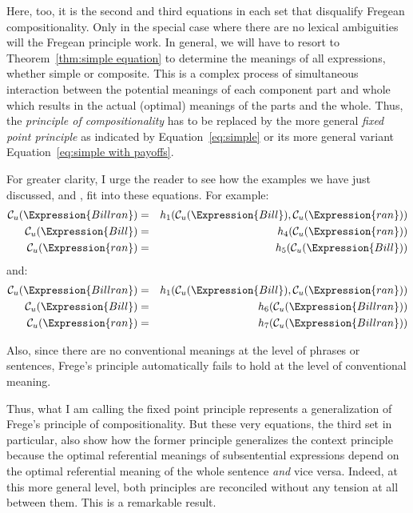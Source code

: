 Here, too, it is the second and third equations in each set that disqualify Fregean compositionality. Only in the special case where there are no lexical ambiguities will the Fregean principle work. In general, we will have to resort to Theorem~\ref{thm:simple equation} to determine the meanings of all expressions, whether simple or composite. This is a complex process of simultaneous interaction between the potential meanings of each component part and whole which results in the actual (optimal) meanings of the parts and the whole. Thus, the \emph{principle of compositionality} has to be replaced by the more general \emph{fixed point principle} as indicated by Equation~\ref{eq:simple} or its more general variant Equation~\ref{eq:simple with payoffs}.

For greater clarity, I urge the reader to see how the examples we have just discussed,  and , fit into these equations. For example:
\begin{eqnarray*}
{\cal C}_u(\Expression{Bill ran}) & = & h_1({\cal C}_u(\Expression{Bill}), {\cal C}_u(\Expression{ran})) \\
{\cal C}_u(\Expression{Bill}) & = & h_4({\cal C}_u(\Expression{ran})) \\
{\cal C}_u(\Expression{ran}) & = & h_5({\cal C}_u(\Expression{Bill}))
\end{eqnarray*}
\noindent and:
\begin{eqnarray*}
{\cal C}_u(\Expression{Bill ran}) & = & h_1({\cal C}_u(\Expression{Bill}), {\cal C}_u(\Expression{ran})) \\
{\cal C}_u(\Expression{Bill}) & = & h_6({\cal C}_u(\Expression{Bill ran})) \\
{\cal C}_u(\Expression{ran}) & = & h_7({\cal C}_u(\Expression{Bill ran}))
\end{eqnarray*}

Also, since there are no conventional meanings at the level of phrases or sentences, Frege's principle automatically fails to hold at the level of conventional meaning.

Thus, what I am calling the fixed point principle represents a generalization of Frege's principle of compositionality. But these very equations, the third set in particular, also show how the former principle generalizes the context principle because the optimal referential meanings of subsentential expressions depend on the optimal referential meaning of the whole sentence \emph{and} vice versa. Indeed, at this more general level, both principles are reconciled without any tension at all between them. This is a remarkable result.

